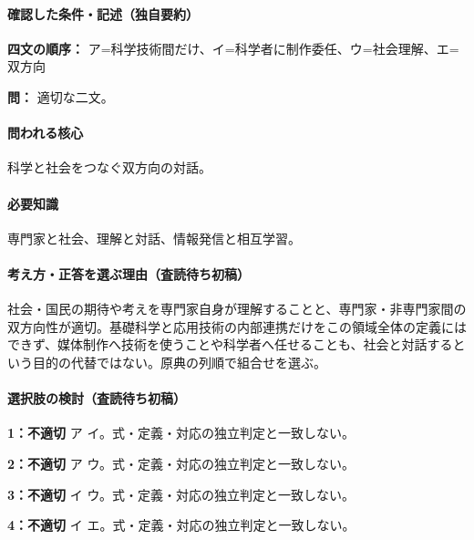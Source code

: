 \paragraph{確認した条件・記述（独自要約）}\mbox{}\par

\noindent\textbf{四文の順序：} ア=科学技術間だけ、イ=科学者に制作委任、ウ=社会理解、エ=双方向\par

\noindent\textbf{問：} 適切な二文。\par

\paragraph{問われる核心} 科学と社会をつなぐ双方向の対話。

\paragraph{必要知識} 専門家と社会、理解と対話、情報発信と相互学習。

\paragraph{考え方・正答を選ぶ理由（査読待ち初稿）} 社会・国民の期待や考えを専門家自身が理解することと、専門家・非専門家間の双方向性が適切。基礎科学と応用技術の内部連携だけをこの領域全体の定義にはできず、媒体制作へ技術を使うことや科学者へ任せることも、社会と対話するという目的の代替ではない。原典の列順で組合せを選ぶ。

\paragraph{選択肢の検討（査読待ち初稿）}\mbox{}\par

\noindent\textbf{1：不適切} ア イ。式・定義・対応の独立判定と一致しない。\par

\noindent\textbf{2：不適切} ア ウ。式・定義・対応の独立判定と一致しない。\par

\noindent\textbf{3：不適切} イ ウ。式・定義・対応の独立判定と一致しない。\par

\noindent\textbf{4：不適切} イ エ。式・定義・対応の独立判定と一致しない。\par

